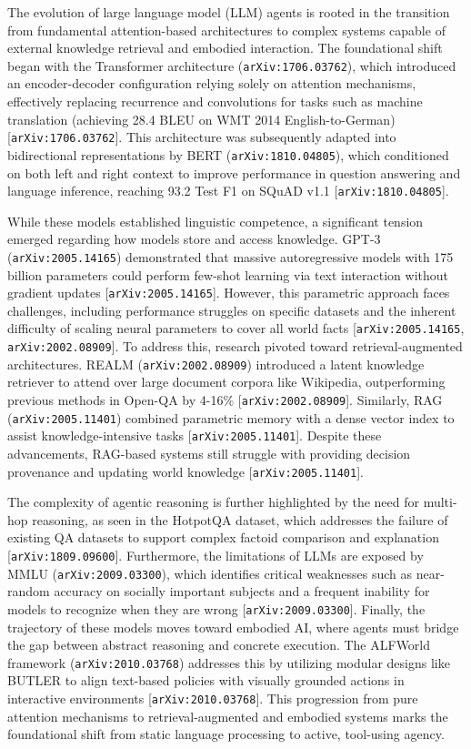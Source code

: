 \documentclass[11pt]{article}
\begin{document}
The evolution of large language model (LLM) agents is rooted in the transition from fundamental attention-based architectures to complex systems capable of external knowledge retrieval and embodied interaction. The foundational shift began with the Transformer architecture (\texttt{arXiv:1706.03762}), which introduced an encoder-decoder configuration relying solely on attention mechanisms, effectively replacing recurrence and convolutions for tasks such as machine translation (achieving 28.4 BLEU on WMT 2014 English-to-German) [\texttt{arXiv:1706.03762}]. This architecture was subsequently adapted into bidirectional representations by BERT (\texttt{arXiv:1810.04805}), which conditioned on both left and right context to improve performance in question answering and language inference, reaching 93.2 Test F1 on SQuAD v1.1 [\texttt{arXiv:1810.04805}].

While these models established linguistic competence, a significant tension emerged regarding how models store and access knowledge. GPT-3 (\texttt{arXiv:2005.14165}) demonstrated that massive autoregressive models with 175 billion parameters could perform few-shot learning via text interaction without gradient updates [\texttt{arXiv:2005.14165}]. However, this parametric approach faces challenges, including performance struggles on specific datasets and the inherent difficulty of scaling neural parameters to cover all world facts [\texttt{arXiv:2005.14165}, \texttt{arXiv:2002.08909}]. To address this, research pivoted toward retrieval-augmented architectures. REALM (\texttt{arXiv:2002.08909}) introduced a latent knowledge retriever to attend over large document corpora like Wikipedia, outperforming previous methods in Open-QA by 4-16\% [\texttt{arXiv:2002.08909}]. Similarly, RAG (\texttt{arXiv:2005.11401}) combined parametric memory with a dense vector index to assist knowledge-intensive tasks [\texttt{arXiv:2005.11401}]. Despite these advancements, RAG-based systems still struggle with providing decision provenance and updating world knowledge [\texttt{arXiv:2005.11401}].

The complexity of agentic reasoning is further highlighted by the need for multi-hop reasoning, as seen in the HotpotQA dataset, which addresses the failure of existing QA datasets to support complex factoid comparison and explanation [\texttt{arXiv:1809.09600}]. Furthermore, the limitations of LLMs are exposed by MMLU (\texttt{arXiv:2009.03300}), which identifies critical weaknesses such as near-random accuracy on socially important subjects and a frequent inability for models to recognize when they are wrong [\texttt{arXiv:2009.03300}]. Finally, the trajectory of these models moves toward embodied AI, where agents must bridge the gap between abstract reasoning and concrete execution. The ALFWorld framework (\texttt{arXiv:2010.03768}) addresses this by utilizing modular designs like BUTLER to align text-based policies with visually grounded actions in interactive environments [\texttt{arXiv:2010.03768}]. This progression from pure attention mechanisms to retrieval-augmented and embodied systems marks the foundational shift from static language processing to active, tool-using agency.
\end{document}
